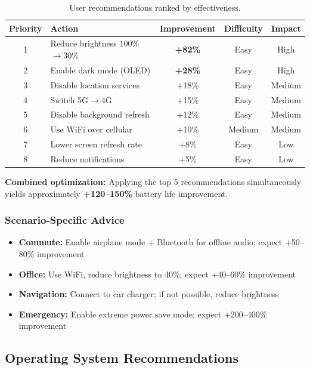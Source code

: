 \begin{table}[H]
    \centering
    \caption{User recommendations ranked by effectiveness.}
    \label{tab:user_recommendations}
    \begin{tabular}{clccc}
        \toprule
        \textbf{Priority} & \textbf{Action} & \textbf{Improvement} & \textbf{Difficulty} & \textbf{Impact} \\
        \midrule
        1 & Reduce brightness 100\%$\to$30\% & \textbf{+82\%} & Easy & High \\
        2 & Enable dark mode (OLED) & \textbf{+28\%} & Easy & High \\
        3 & Disable location services & +18\% & Easy & Medium \\
        4 & Switch 5G$\to$4G & +15\% & Easy & Medium \\
        5 & Disable background refresh & +12\% & Easy & Medium \\
        6 & Use WiFi over cellular & +10\% & Medium & Medium \\
        7 & Lower screen refresh rate & +8\% & Easy & Low \\
        8 & Reduce notifications & +5\% & Easy & Low \\
        \bottomrule
    \end{tabular}
\end{table}

\textbf{Combined optimization:} Applying the top 5 recommendations simultaneously yields approximately \textbf{+120--150\%} battery life improvement.

\subsubsection{Scenario-Specific Advice}

\begin{itemize}
    \item \textbf{Commute:} Enable airplane mode + Bluetooth for offline audio; expect +50--80\% improvement
    \item \textbf{Office:} Use WiFi, reduce brightness to 40\%; expect +40--60\% improvement
    \item \textbf{Navigation:} Connect to car charger; if not possible, reduce brightness
    \item \textbf{Emergency:} Enable extreme power save mode; expect +200--400\% improvement
\end{itemize}

\subsection{Operating System Recommendations}
\label{subsec:os_recommendations}

